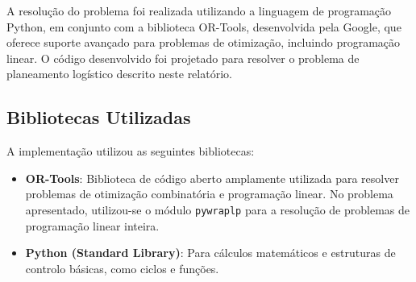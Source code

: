 A resolução do problema foi realizada utilizando a linguagem de programação Python, em conjunto com a biblioteca OR-Tools, desenvolvida pela Google, que oferece suporte avançado para problemas de otimização, incluindo programação linear.
O código desenvolvido foi projetado para resolver o problema de planeamento logístico descrito neste relatório.

\subsection{Bibliotecas Utilizadas}\label{subsec:bibliotecas-utilizadas}
A implementação utilizou as seguintes bibliotecas:
\begin{itemize}
    \item \textbf{OR-Tools}: Biblioteca de código aberto amplamente utilizada para resolver problemas de otimização combinatória e programação linear. No problema apresentado, utilizou-se o módulo \texttt{pywraplp} para a resolução de problemas de programação linear inteira.
    \item \textbf{Python (Standard Library)}: Para cálculos matemáticos e estruturas de controlo básicas, como ciclos e funções.
\end{itemize}


